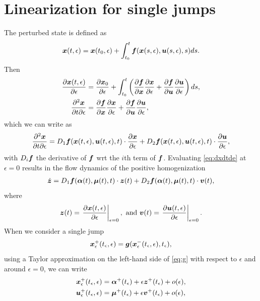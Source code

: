\documentclass[../DC2017114Bouma.tex]{subfiles}
\begin{document}
\section{Linearization for single jumps}
The perturbed state is defined as
\begin{align}
{\boldsymbol{x}}(t,\epsilon) = {\boldsymbol{x}}(t_0,\epsilon) + \int_{t_0}^{t}{\boldsymbol{f}}({\boldsymbol{x}}(s,\epsilon),{\boldsymbol{u}}(s,\epsilon),s)ds.
\end{align}
Then
\begin{align}
\frac{\partial{\boldsymbol{x}}(t,\epsilon)}{\partial\epsilon} &= \frac{\partial{\boldsymbol{x}}_0}{\partial\epsilon} + \int_{t_0}^{t}\left(\frac{\partial{\boldsymbol{f}}}{\partial{\boldsymbol{x}}}\frac{\partial{\boldsymbol{x}}}{\partial\epsilon} + \frac{\partial{\boldsymbol{f}}}{\partial{\boldsymbol{u}}}\frac{\partial{\boldsymbol{u}}}{\partial\epsilon}\right)ds,\\
\frac{\partial^2{\boldsymbol{x}}}{\partial t\partial\epsilon} &= \frac{\partial{\boldsymbol{f}}}{\partial{\boldsymbol{x}}}\frac{\partial{\boldsymbol{x}}}{\partial\epsilon} + \frac{\partial{\boldsymbol{f}}}{\partial{\boldsymbol{u}}}\frac{\partial{\boldsymbol{u}}}{\partial\epsilon},
\end{align}
which we can write as
\begin{align}
\frac{\partial^2{\boldsymbol{x}}}{\partial t\partial\epsilon} = D_1{\boldsymbol{f}}({\boldsymbol{x}}(t,\epsilon),{\boldsymbol{u}}(t,\epsilon),t)\cdot \frac{\partial{\boldsymbol{x}}}{\partial\epsilon} + D_2{\boldsymbol{f}}({\boldsymbol{x}}(t,\epsilon),{\boldsymbol{u}}(t,\epsilon),t)\cdot \frac{\partial{\boldsymbol{u}}}{\partial\epsilon}, \label{eq:dxdtde}
\end{align}
with $D_i{\boldsymbol{f}}$ the derivative of ${\boldsymbol{f}}$ wrt the $i$th term of ${\boldsymbol{f}}$. Evaluating \eqref{eq:dxdtde} at $\epsilon = 0$ results in the flow dynamics of the positive homogenization
\begin{align}
\dot{{\boldsymbol{z}}} = D_1{\boldsymbol{f}}(\boldsymbol{\alpha}(t),\boldsymbol{\mu}(t),t)\cdot {\boldsymbol{z}}(t) + D_2{\boldsymbol{f}}(\boldsymbol{\alpha}(t),\boldsymbol{\mu}(t),t)\cdot {\boldsymbol{v}}(t),
\end{align}
where 
\begin{align}
{\boldsymbol{z}}(t) = \left.\frac{\partial{\boldsymbol{x}}(t,\epsilon)}{\partial\epsilon}\right|_{\epsilon=0},\text{ and } {\boldsymbol{v}}(t) = \left.\frac{\partial{\boldsymbol{u}}(t,\epsilon)}{\partial\epsilon}\right|_{\epsilon=0} .
\end{align}
When we consider a single jump
\begin{align}
{\boldsymbol{x}}^{+}_\epsilon(t_\epsilon,\epsilon) = {\boldsymbol{g}}({\boldsymbol{x}}^{-}_\epsilon(t_\epsilon,\epsilon),t_\epsilon),\label{eq:g}
\end{align}
using a Taylor approximation on the left-hand side of \eqref{eq:g} with respect to $\epsilon$ and around $\epsilon = 0$, we can write
\begin{align}
{\boldsymbol{x}}^{+}_\epsilon(t_\epsilon,\epsilon) &= \boldsymbol{\alpha}^{+}(t_\epsilon) + \epsilon {\boldsymbol{z}}^{+}(t_\epsilon) + o(\epsilon),\label{eq:xe}\\
{\boldsymbol{u}}^{+}_\epsilon(t_\epsilon,\epsilon) &= \boldsymbol{\mu}^{+}(t_\epsilon) + \epsilon {\boldsymbol{v}}^{+}(t_\epsilon) + o(\epsilon),\label{eq:ue}
\end{align}
\end{document}
